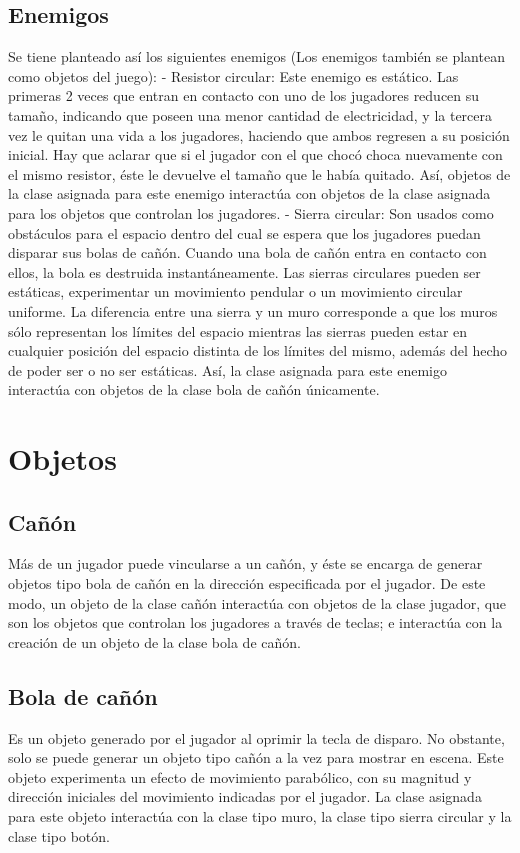 \documentclass{article}
\begin{document}
\subsection{Enemigos}
Se tiene planteado así los siguientes enemigos (Los enemigos también se plantean como objetos del juego):
    - Resistor circular: Este enemigo es estático. Las primeras 2 veces que entran en contacto con uno de los jugadores reducen su tamaño, indicando que poseen una menor cantidad de electricidad, y la tercera vez le quitan una vida a los jugadores, haciendo que ambos regresen a su posición inicial. Hay que aclarar que si el jugador con el que chocó choca nuevamente con el mismo resistor, éste le devuelve el tamaño que le había quitado. Así, objetos de la clase asignada para este enemigo interactúa con objetos de la clase asignada para los objetos que controlan los jugadores.
    - Sierra circular: Son usados como obstáculos para el espacio dentro del cual se espera que los jugadores puedan disparar sus bolas de cañón. Cuando una bola de cañón entra en contacto con ellos, la bola es destruida instantáneamente. Las sierras circulares pueden ser estáticas, experimentar un movimiento pendular o un movimiento circular uniforme. La diferencia entre una sierra y un muro corresponde a que los muros sólo representan los límites del espacio mientras las sierras pueden estar en cualquier posición del espacio distinta de los límites del mismo, además del hecho de poder ser o no ser estáticas. Así, la clase asignada para este enemigo interactúa con objetos de la clase bola de cañón únicamente.
\section{Objetos}
\subsection{Cañón}
Más de un jugador puede vincularse a un cañón, y éste se encarga de generar objetos tipo bola de cañón en la dirección especificada por el jugador. De este modo, un objeto de la clase cañón interactúa con objetos de la clase jugador, que son los objetos que controlan los jugadores a través de teclas; e interactúa con la creación de un objeto de la clase bola de cañón.
\subsection{Bola de cañón}
Es un objeto generado por el jugador al oprimir la tecla de disparo. No obstante, solo se puede generar un objeto tipo cañón a la vez para mostrar en escena. Este objeto experimenta un efecto de movimiento parabólico, con su magnitud y dirección iniciales del movimiento indicadas por el jugador. La clase asignada para este objeto interactúa con la clase tipo muro, la clase tipo sierra circular y la clase tipo botón.
\end{document}
